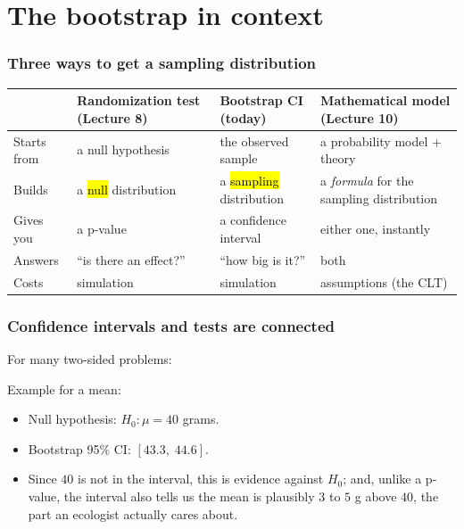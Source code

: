\documentclass[slidestop,compress,mathserif]{beamer}
\begin{document}
\section{The bootstrap in context}
\begin{frame}
\frametitle{Three ways to get a sampling distribution}

{\scriptsize
\begin{center}
\begin{tabular}{p{}p{}p{}p{}}
\toprule
& \textbf{Randomization test} \newline (Lecture 8) & \textbf{Bootstrap CI} \newline (today) & \textbf{Mathematical model} \newline (Lecture 10) \\
\midrule
Starts from & a null hypothesis & the observed sample & a probability model + theory \\
Builds & a \hl{null} distribution & a \hl{sampling} distribution & a \emph{formula} for the sampling distribution \\
Gives you & a p-value & a confidence interval & either one, instantly \\
Answers & ``is there an effect?'' & ``how big is it?'' & both \\
Costs & simulation & simulation & assumptions (the CLT) \\
\bottomrule
\end{tabular}
\end{center}}

\vspace{0.2em}

\end{frame}


\begin{frame}
\frametitle{Confidence intervals and tests are connected}

For many two-sided problems:


\vspace{0.4em}
Example for a mean:
\begin{itemize}
\item Null hypothesis: $H_0: \mu = 40$ grams.
\item Bootstrap 95\% CI: $[43.3,\;44.6]$.
\item Since $40$ is not in the interval, this is evidence against $H_0$; and, unlike a p-value, the interval also tells us the mean is plausibly $3$ to $5$ g above $40$, the part an ecologist actually cares about.
\end{itemize}

\end{frame}
\end{document}
